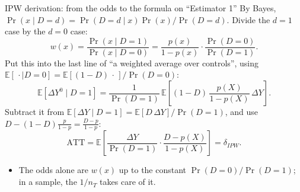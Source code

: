 \documentclass[
  11pt,
  ignorenonframetext,
  aspectratio=169,
]{beamer}
\providecommand{\tightlist}{%
  \setlength{\itemsep}{0pt}\setlength{\parskip}{0pt}}
\begin{document}
\begin{frame}{IPW derivation: from the odds to the formula on
``Estimator 1''}
\protect{}\label{ipw-derivation-from-the-odds-to-the-formula-on-estimator-1}
By Bayes, \(\Pr(x \mid D=d) = \Pr(D=d \mid x)\Pr(x)/\Pr(D=d)\). Divide
the \(d=1\) case by the \(d=0\) case: \[
w(x) = \frac{\Pr(x \mid D=1)}{\Pr(x \mid D=0)} = \frac{p(x)}{1-p(x)} \cdot \frac{\Pr(D=0)}{\Pr(D=1)} .
\] Put this into the last line of ``a weighted average over controls'',
using
\(\mathbb{E}[\,\cdot \mid D=0] = \mathbb{E}[(1-D)\,\cdot\,]/\Pr(D=0)\):
\[
\mathbb{E}[\Delta Y^0 \mid D=1] = \frac{1}{\Pr(D=1)}\,\mathbb{E}\!\left[(1-D)\,\frac{p(X)}{1-p(X)}\,\Delta Y\right] .
\] Subtract it from
\(\mathbb{E}[\Delta Y \mid D=1] = \mathbb{E}[D\,\Delta Y]/\Pr(D=1)\),
and use \(D - (1-D)\frac{p}{1-p} = \frac{D-p}{1-p}\): \[
\text{ATT} = \mathbb{E}\!\left[\frac{\Delta Y}{\Pr(D=1)} \cdot \frac{D - p(X)}{1-p(X)}\right] = \delta_{IPW} .
\]

\begin{itemize}
\tightlist
\item
  The odds alone are \(w(x)\) up to the constant \(\Pr(D=0)/\Pr(D=1)\);
  in a sample, the \(1/n_T\) takes care of it.
\end{itemize}
\end{frame}
\end{document}
